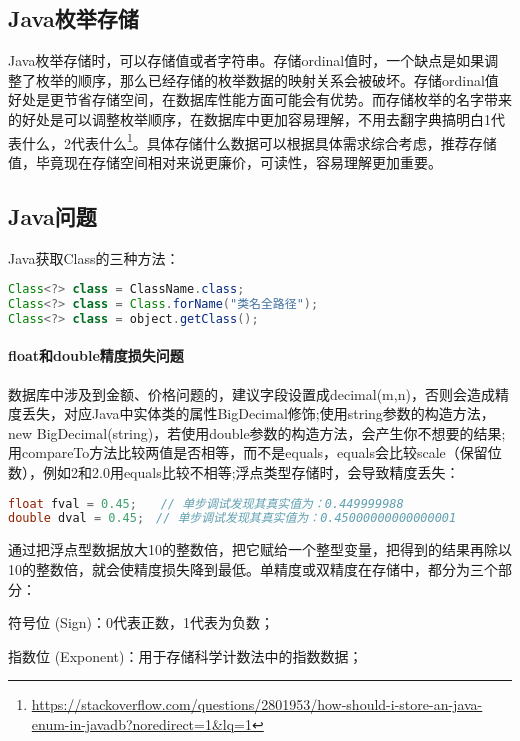 \documentclass[../../../interview-questions.tex]{subfiles}
\begin{document}
\subsection{Java枚举存储}

Java枚举存储时，可以存储值或者字符串。存储ordinal值时，一个缺点是如果调整了枚举的顺序，那么已经存储的枚举数据的映射关系会被破坏。存储ordinal值好处是更节省存储空间，在数据库性能方面可能会有优势。而存储枚举的名字带来的好处是可以调整枚举顺序，在数据库中更加容易理解，不用去翻字典搞明白1代表什么，2代表什么\footnote{\url{https://stackoverflow.com/questions/2801953/how-should-i-store-an-java-enum-in-javadb?noredirect=1&lq=1}}。具体存储什么数据可以根据具体需求综合考虑，推荐存储值，毕竟现在存储空间相对来说更廉价，可读性，容易理解更加重要。


\subsection{Java问题}

Java获取Class的三种方法：

\begin{lstlisting}[language=Java]
Class<?> class = ClassName.class;
Class<?> class = Class.forName("类名全路径");
Class<?> class = object.getClass();
\end{lstlisting}

\paragraph{float和double精度损失问题}

数据库中涉及到金额、价格问题的，建议字段设置成decimal(m,n)，否则会造成精度丢失，对应Java中实体类的属性BigDecimal修饰;使用string参数的构造方法，new  BigDecimal(string)，若使用double参数的构造方法，会产生你不想要的结果;用compareTo方法比较两值是否相等，而不是equals，equals会比较scale（保留位数），例如2和2.0用equals比较不相等;浮点类型存储时，会导致精度丢失：

\begin{lstlisting}[language=Java]
float fval = 0.45;　　// 单步调试发现其真实值为：0.449999988
double dval = 0.45;　// 单步调试发现其真实值为：0.45000000000000001
\end{lstlisting}

通过把浮点型数据放大10的整数倍，把它赋给一个整型变量，把得到的结果再除以10的整数倍，就会使精度损失降到最低。单精度或双精度在存储中，都分为三个部分：

符号位 (Sign)：0代表正数，1代表为负数；

指数位 (Exponent)：用于存储科学计数法中的指数数据；
\end{document}
